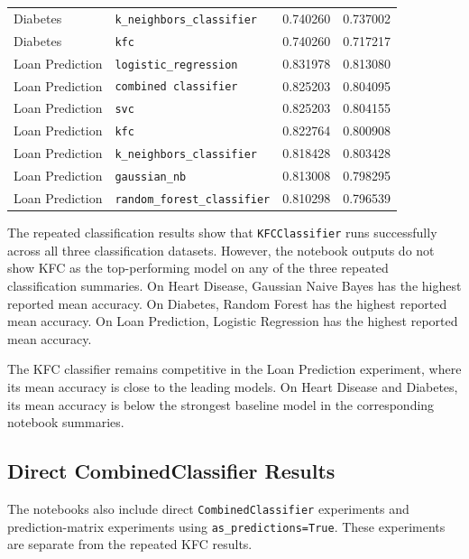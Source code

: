 \begin{table}[H]
\begin{tabular}{l l c c}
        Diabetes         & \texttt{k\_neighbors\_classifier}   & 0.740260               & 0.737002 \\
        Diabetes         & \texttt{kfc}                      & 0.740260               & 0.717217 \\
        \hline
        Loan Prediction  & \texttt{logistic\_regression}      & 0.831978               & 0.813080 \\
        Loan Prediction  & \texttt{combined classifier}      & 0.825203               & 0.804095 \\
        Loan Prediction  & \texttt{svc}                      & 0.825203               & 0.804155 \\
        Loan Prediction  & \texttt{kfc}                      & 0.822764               & 0.800908 \\
        Loan Prediction  & \texttt{k\_neighbors\_classifier}   & 0.818428               & 0.803428 \\
        Loan Prediction  & \texttt{gaussian\_nb}              & 0.813008               & 0.798295 \\
        Loan Prediction  & \texttt{random\_forest\_classifier} & 0.810298               & 0.796539 \\
        \hline
    \end{tabular}
\end{table}

The repeated classification results show that \texttt{KFCClassifier} runs successfully across all three classification datasets. However, the notebook outputs do not show KFC as the top-performing model on any of the three repeated classification summaries. On Heart Disease, Gaussian Naive Bayes has the highest reported mean accuracy. On Diabetes, Random Forest has the highest reported mean accuracy. On Loan Prediction, Logistic Regression has the highest reported mean accuracy.

The KFC classifier remains competitive in the Loan Prediction experiment, where its mean accuracy is close to the leading models. On Heart Disease and Diabetes, its mean accuracy is below the strongest baseline model in the corresponding notebook summaries.

\subsection{Direct CombinedClassifier Results}

The notebooks also include direct \texttt{CombinedClassifier} experiments and prediction-matrix experiments using \texttt{as\_predictions=True}. These experiments are separate from the repeated KFC results.

